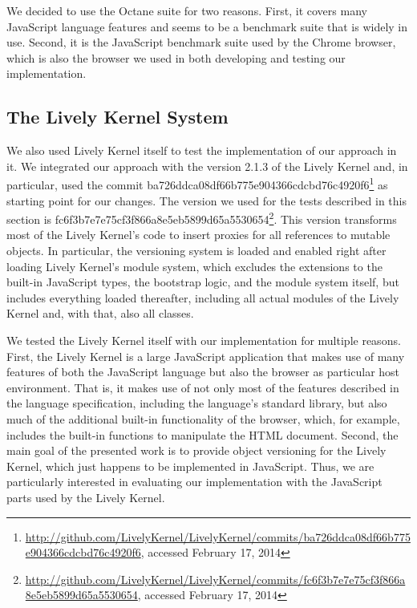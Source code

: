We decided to use the Octane suite for two reasons.
First, it covers many JavaScript language features and seems to be a benchmark suite that is widely in use.
Second, it is the JavaScript benchmark suite used by the Chrome browser, which is also the browser we used in both developing and testing our implementation.


\subsection{The Lively Kernel System}

We also used Lively Kernel itself to test the implementation of our approach in it.
We integrated our approach with the version 2.1.3 of the Lively Kernel and, in particular, used the commit ba726ddca08df66b775e904366cdcbd76c4920f6\footnote{\url{http://github.com/LivelyKernel/LivelyKernel/commits/ba726ddca08df66b775e904366cdcbd76c4920f6}, accessed February 17, 2014} as starting point for our changes.
The version we used for the tests described in this section is fc6f3b7e7e75cf3f866a8e5eb5899d65a5530654\footnote{\url{http://github.com/LivelyKernel/LivelyKernel/commits/fc6f3b7e7e75cf3f866a8e5eb5899d65a5530654}, accessed February 17, 2014}.
This version transforms most of the Lively Kernel's code to insert proxies for all references to mutable objects.
In particular, the versioning system is loaded and enabled right after loading Lively Kernel's module system, which excludes the extensions to the built-in JavaScript types, the bootstrap logic, and the module system itself, but includes everything loaded thereafter, including all actual modules of the Lively Kernel and, with that, also all classes.

We tested the Lively Kernel itself with our implementation for multiple reasons.
First, the Lively Kernel is a large JavaScript application that makes use of many features of both the JavaScript language but also the browser as particular host environment.
That is, it makes use of not only most of the features described in the language specification, including the language's standard library, but also much of the additional built-in functionality of the browser, which, for example, includes the built-in functions to manipulate the HTML document.
Second, the main goal of the presented work is to provide object versioning for the Lively Kernel, which just happens to be implemented in JavaScript.
Thus, we are particularly interested in evaluating our implementation with the JavaScript parts used by the Lively Kernel.


